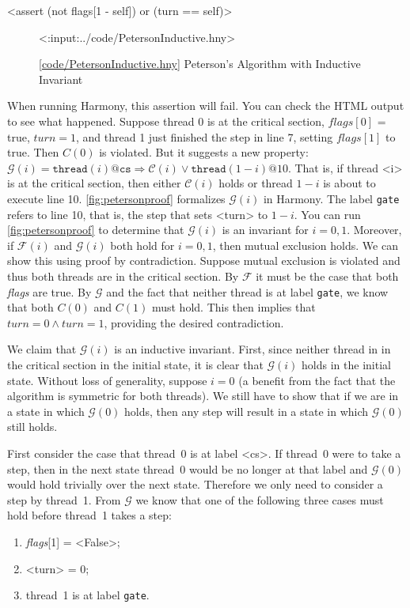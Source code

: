 \documentclass{report}
\newcommand{\harmonylink}[1]{%
[\href{https://harmony.cs.cornell.edu/#1}{\underline{#1}}]%
}
\newenvironment{code}{
\tcolorbox
}{
\endtcolorbox
}
\begin{document}
\begin{code}
<{assert (not flags[1 - self]) or (turn == self)}>
\end{code}

\begin{figure}
\begin{code}
<{:input:../code/PetersonInductive.hny}>
\end{code}
\caption{\harmonylink{code/PetersonInductive.hny} Peterson's Algorithm with Inductive Invariant}
\label{fig:petersonproof}
\end{figure}

When running Harmony, this assertion will fail.
You can check the HTML output to see what happened.
Suppose thread 0 is at the critical section, $\mathit{flags}[0]$ = true,
$\mathit{turn} = 1$, and thread 1 just finished the step in line 7,
setting $\mathit{flags}[1]$ to true.  Then $C(0)$ is violated.
But it suggests a new property:
$\mathcal{G}(i) =
\mathtt{thread}(i)@\mathtt{cs} \Rightarrow \mathcal{C}(i) \lor \mathtt{thread}(1-i)@10$.
That is, if thread <{i}> is at the critical section, then
either $\mathcal{C}(i)$ holds or thread $1-i$ is about to execute line 10.
\autoref{fig:petersonproof} formalizes $\mathcal{G}(i)$ in Harmony.
The label \texttt{gate} refers to line 10, that is,
the step that sets <{turn}> to $1-i$.
You can run \autoref{fig:petersonproof} to determine
that $\mathcal{G}(i)$ is an invariant for $i = 0, 1$.
Moreover, if $\mathcal{F}(i)$ and $\mathcal{G}(i)$ both hold for $i = 0, 1$,
then mutual exclusion holds.  We can show this using proof by
contradiction.  Suppose mutual exclusion is violated and thus both threads are in
the critical section.  By $\mathcal{F}$ it must be the case that both
\textit{flags} are true.  By $\mathcal{G}$ and the fact that neither thread
is at label \texttt{gate}, we know that both $C(0)$ and $C(1)$ must hold.
This then implies that $\mathit{turn} = 0 \land \mathit{turn} = 1$, providing
the desired contradiction.

We claim that $\mathcal{G}(i)$ is an inductive invariant.
First, since neither thread in in the critical section in the initial state,
it is clear that $\mathcal{G}(i)$ holds in the initial state.
Without loss of generality, suppose $i=0$ (a benefit from the fact that the algorithm is
symmetric for both threads).  We still have to show that if we are in a state
in which $\mathcal{G}(0)$ holds, then any step will result in a
state in which $\mathcal{G}(0)$ still holds.

First consider the case that thread~0 is at label <{cs}>.  If thread~0
were to take a step, then in the next state thread~0 would be no longer
at that label and $\mathcal{G}(0)$ would hold trivially over the next state.
Therefore we only need to consider a step by thread~1.
%
From $\mathcal{G}$ we know that one of the following three cases must hold before
thread~1 takes a step:
\begin{enumerate}
\item \textit{flags}[1] = <{False}>;
\item <{turn}> = 0;
\item thread~1 is at label \texttt{gate}.
\end{enumerate}
\end{document}

